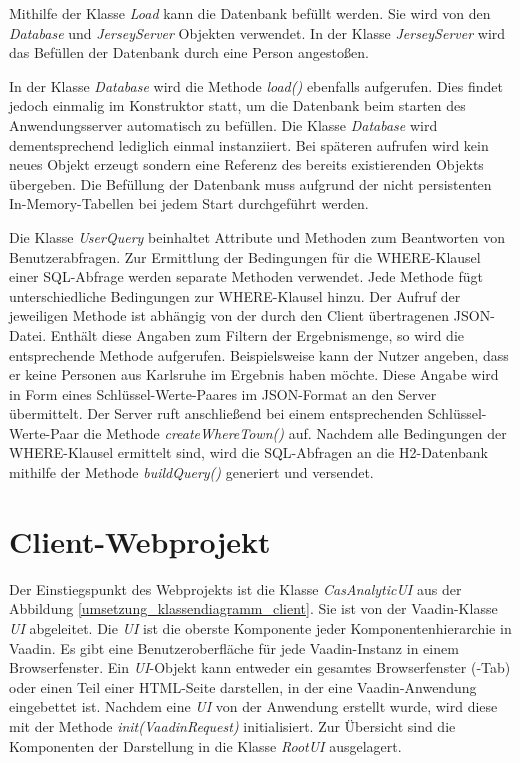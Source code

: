 Mithilfe der Klasse \textit{Load} kann die Datenbank befüllt werden. Sie wird von den \textit{Database} und \textit{JerseyServer} Objekten verwendet. In der Klasse \textit{JerseyServer} wird das Befüllen der Datenbank durch eine Person angestoßen.

In der Klasse \textit{Database} wird die Methode \textit{load()} ebenfalls aufgerufen. Dies findet jedoch einmalig im Konstruktor statt, um die Datenbank beim starten des Anwendungsserver automatisch zu befüllen. Die Klasse \textit{Database} wird dementsprechend lediglich einmal instanziiert. Bei späteren aufrufen wird kein neues Objekt erzeugt sondern eine Referenz des bereits existierenden Objekts übergeben. Die Befüllung der Datenbank muss aufgrund der nicht persistenten In-Memory-Tabellen bei jedem Start durchgeführt werden. 

Die Klasse \textit{UserQuery} beinhaltet Attribute und Methoden zum Beantworten von Benutzerabfragen. Zur Ermittlung der Bedingungen für die WHERE-Klausel einer SQL-Abfrage werden separate Methoden verwendet. Jede Methode fügt unterschiedliche Bedingungen zur WHERE-Klausel hinzu. Der Aufruf der jeweiligen Methode ist abhängig von der durch den Client übertragenen JSON-Datei. Enthält diese Angaben zum Filtern der Ergebnismenge, so wird die entsprechende Methode aufgerufen. Beispielsweise kann der Nutzer angeben, dass er keine Personen aus Karlsruhe im Ergebnis haben möchte. Diese Angabe wird in Form eines Schlüssel-Werte-Paares im JSON-Format an den Server übermittelt. Der Server ruft anschließend bei einem entsprechenden Schlüssel-Werte-Paar die Methode \textit{createWhereTown()} auf. Nachdem alle Bedingungen der WHERE-Klausel ermittelt sind, wird die SQL-Abfragen an die H2-Datenbank mithilfe der Methode \textit{buildQuery()} generiert und versendet. 

\section{Client-Webprojekt}
\label{ch:Umsetzung:sec:clientwar}

Der Einstiegspunkt des Webprojekts ist die Klasse \textit{CasAnalyticUI} aus der Abbildung \ref{umsetzung_klassendiagramm_client}. Sie ist von der Vaadin-Klasse \textit{UI} abgeleitet. Die \textit{UI} ist die oberste Komponente jeder Komponentenhierarchie in Vaadin. Es gibt eine Benutzeroberfläche für jede Vaadin-Instanz in einem Browserfenster. Ein \textit{UI}-Objekt kann entweder ein gesamtes Browserfenster (-Tab) oder einen Teil einer HTML-Seite darstellen, in der eine Vaadin-Anwendung eingebettet ist. Nachdem eine \textit{UI} von der Anwendung erstellt wurde, wird diese mit der Methode \textit{init(VaadinRequest)} initialisiert. Zur Übersicht sind die Komponenten der Darstellung in die Klasse \textit{RootUI} ausgelagert. 

